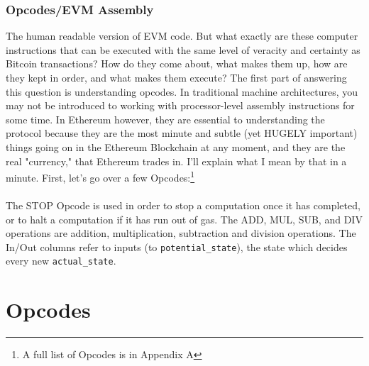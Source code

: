 \documentclass[10pt,a4paper,leqno,bibliography=totoc]{scrartcl}
\newenvironment{alphafootnotes}
{\par\edef\savedfootnotenumber{\number\value{footnote}}
\renewcommand{\thefootnote}{\alph{footnote}}
\setcounter{footnote}{0}}
{\par\setcounter{footnote}{\savedfootnotenumber}}
\begin{document}
\begin{alphafootnotes}
\begin{multicols*}{2}
			\subsubsection{Opcodes/EVM Assembly}
		The human readable version of EVM code. But what exactly are these computer instructions that can be executed with the same level of veracity and certainty as Bitcoin transactions? How do they come about, what makes them up, how are they kept in order, and what makes them execute? The first part of answering this question is understanding opcodes. In traditional machine architectures, you may not be introduced to working with processor-level assembly instructions for some time. In Ethereum however, they are essential to understanding the protocol because they are the most minute and subtle (yet HUGELY important) things going on in the Ethereum Blockchain at any moment, and they are the real "currency," that Ethereum trades in. I'll explain what I mean by that in a minute. First, let's go over a few Opcodes:\footnote{A full list of Opcodes is in Appendix A} \\


				\paragraph{}The STOP Opcode is used in order to stop a computation once it has completed, or to halt a computation if it has run out of gas. The ADD, MUL, SUB, and DIV operations are addition, multiplication, subtraction and division operations. The In/Out columns refer to inputs (to \texttt{potential\_state}), the state which decides every new \texttt{actual\_state}. 

	\end{multicols*}

	\appendix

	\section{Opcodes}


\end{alphafootnotes}
\end{document}

